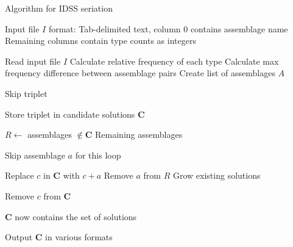 \documentclass[10pt,letterpaper]{article}
\begin{document}
\begin{algorithm}[h]
\caption{Algorithm for IDSS seriation}\label{alg:idss}
\begin{algorithmic}[1]

 \Require  Input file $I$ format:  
 \State Tab-delimited text, column 0 contains assemblage name
 \State Remaining columns contain type counts as integers

   
   \State Read input file $I$
   \State Calculate relative frequency of each type
   \State Calculate max frequency difference between assemblage pairs
   \State Create list of assemblages $A$
    
            \State Skip triplet
            \EndIf
        \EndIf

            \State Store triplet in candidate solutions $\mathbf{C}$
        \EndIf

        

        \State $R \gets$ assemblages $\notin \mathbf{C}$  
        \Comment Remaining assemblages
        

        \Repeat
                        \State Skip assemblage $a$ for this loop
                    \EndIf
                \EndIf
                
                    \State Replace $c$ in $\mathbf{C}$ with $c+a$
                    \State Remove $a$ from $R$
                    \Comment Grow existing solutions
                \EndIf
            
            \EndFor        
            

                    \State Remove $c$ from $\mathbf{C}$
                \EndIf
            \EndFor

    \EndFor
    \Comment $\mathbf{C}$ now contains the set of solutions
    
    \State Output $\mathbf{C}$ in various formats
    

\EndProcedure
\end{algorithmic}
\end{algorithm}
\end{document}
